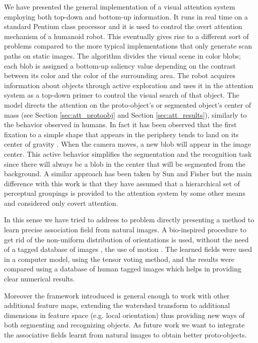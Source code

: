 \documentclass{llncs}
\begin{document}
We have presented the general implementation of a visual
attention system employing both top-down and
bottom-up information. It runs in real time on a
standard Pentium class processor and it is used to
control the overt attention mechanism of a humanoid
robot. This eventually gives rise to a different sort of
problems compared to the more typical
implementations that only generate scan paths on static
images.
The algorithm divides the visual scene in color
blobs; each blob is assigned a bottom-up saliency value
depending on the contrast between its color and the
color of the surrounding area. The robot acquires
information about objects through active exploration
and uses it in the attention system as a top-down
primer to control the visual search of that object. The
model directs the attention on the proto-object's or
segmented object's center of mass (see Section \ref{sec:att_protoobj} and
Section \ref{sec:att_results}), similarly to the behavior observed in
humans. In fact it has been observed that the first
fixation to a simple shape that appears in the periphery
tends to land on its center of gravity \cite{MelcherK99}.
When the camera moves, a new blob will appear in
the image center. This active behavior simplifies the
segmentation and the recognition task since there will
always be a blob in the center that will be segmented
from the background.
A similar approach has been taken by Sun and
Fisher \cite{SunF03} but the main difference with this work is that
they have assumed that a hierarchical set of perceptual
groupings is provided to the attention system by some
other means and considered only covert attention.

In this sense we have tried to address to problem directly presenting a method to learn
precise association field from natural images. A bio-inspired procedure
to get rid of the non-uniform distribution of orientations
is used, without the need of a tagged database of images \cite{ElderG02},
the use of motion \cite{Prodohl01}.
The learned fields were used in a computer model, using the tensor voting method,
and the results were compared using a database of human tagged images which helps
in providing clear numerical results.

Moreover the framework introduced is general enough
to work with other additional feature maps, extending the
watershed transform to additional dimensions in feature
space (e.g. local orientation) thus providing new ways
of both segmenting and recognizing objects.
As future work we want to integrate the associative fields
learnt from natural images to obtain better proto-objects.








\end{document}
